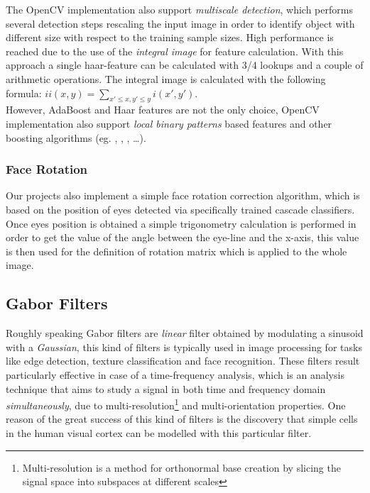 The OpenCV implementation also support \emph{multiscale detection}, which performs several detection steps rescaling the input image in order to identify object with different size with respect to the training sample sizes. High performance is reached due to the use of the \emph{integral image} for feature calculation. With this approach a single haar-feature can be calculated with 3/4 lookups and a couple of arithmetic operations. The integral image is calculated with the following formula: $ ii(x,y) = \sum_{x' \leq x, y' \leq y}{ i(x',y') } $.\\

However, AdaBoost and Haar features are not the only choice, OpenCV implementation also support \emph{local binary patterns} based features and other boosting algorithms (eg. , , , \ldots).


\subsubsection*{Face Rotation}

Our projects also implement a simple face rotation correction algorithm, which is based on the position of eyes detected via specifically trained cascade classifiers. Once eyes position is obtained a simple trigonometry calculation is performed in order to get the value of the angle between the eye-line and the x-axis, this value is then used for the definition of rotation matrix which is applied to the whole image.

\subsection{Gabor Filters}

Roughly speaking Gabor filters are \emph{linear} filter obtained by modulating a sinusoid with a \emph{Gaussian}, this kind of filters is typically used in image processing for tasks like edge detection, texture classification and face recognition\cite{gaborApplication}. These filters result particularly effective in case of a time-frequency analysis, which is an analysis technique that aims to study a signal in both time and frequency domain \emph{simultaneously}, due to multi-resolution\footnote{Multi-resolution is a method for orthonormal base creation by slicing the signal space into subspaces at different scales} and multi-orientation properties. One reason of the great success of this kind of filters is the discovery that simple cells in the human visual cortex can be modelled with this particular filter.

